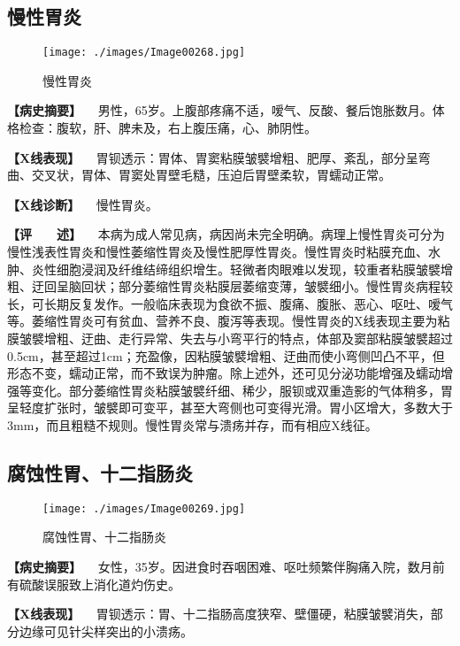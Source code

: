 \subsection{慢性胃炎}

\begin{figure}[!htbp]
 \centering
 \texttt{[image: ./images/Image00268.jpg]}
 \captionsetup{justification=centering}
 \caption{慢性胃炎}
 \label{fig5-3-7}
  \end{figure} 

\textbf{【病史摘要】}
　男性，65岁。上腹部疼痛不适，嗳气、反酸、餐后饱胀数月。体格检查：腹软，肝、脾未及，右上腹压痛，心、肺阴性。

\textbf{【X线表现】}
　胃钡透示：胃体、胃窦粘膜皱襞增粗、肥厚、紊乱，部分呈弯曲、交叉状，胃体、胃窦处胃壁毛糙，压迫后胃壁柔软，胃蠕动正常。

\textbf{【X线诊断】} 　慢性胃炎。

\textbf{【评　　述】}
　本病为成人常见病，病因尚未完全明确。病理上慢性胃炎可分为慢性浅表性胃炎和慢性萎缩性胃炎及慢性肥厚性胃炎。慢性胃炎时粘膜充血、水肿、炎性细胞浸润及纤维结缔组织增生。轻微者肉眼难以发现，较重者粘膜皱襞增粗、迂回呈脑回状；部分萎缩性胃炎粘膜层萎缩变薄，皱襞细小。慢性胃炎病程较长，可长期反复发作。一般临床表现为食欲不振、腹痛、腹胀、恶心、呕吐、嗳气等。萎缩性胃炎可有贫血、营养不良、腹泻等表现。慢性胃炎的X线表现主要为粘膜皱襞增粗、迂曲、走行异常、失去与小弯平行的特点，体部及窦部粘膜皱襞超过0.5cm，甚至超过1cm；充盈像，因粘膜皱襞增粗、迂曲而使小弯侧凹凸不平，但形态不变，蠕动正常，而不致误为肿瘤。除上述外，还可见分泌功能增强及蠕动增强等变化。部分萎缩性胃炎粘膜皱襞纤细、稀少，服钡或双重造影的气体稍多，胃呈轻度扩张时，皱襞即可变平，甚至大弯侧也可变得光滑。胃小区增大，多数大于3mm，而且粗糙不规则。慢性胃炎常与溃疡并存，而有相应X线征。

\subsection{腐蚀性胃、十二指肠炎}

\begin{figure}[!htbp]
 \centering
 \texttt{[image: ./images/Image00269.jpg]}
 \captionsetup{justification=centering}
 \caption{腐蚀性胃、十二指肠炎}
 \label{fig5-3-8}
  \end{figure} 

\textbf{【病史摘要】}
　女性，35岁。因进食时吞咽困难、呕吐频繁伴胸痛入院，数月前有硫酸误服致上消化道灼伤史。

\textbf{【X线表现】}
　胃钡透示：胃、十二指肠高度狭窄、壁僵硬，粘膜皱襞消失，部分边缘可见针尖样突出的小溃疡。

